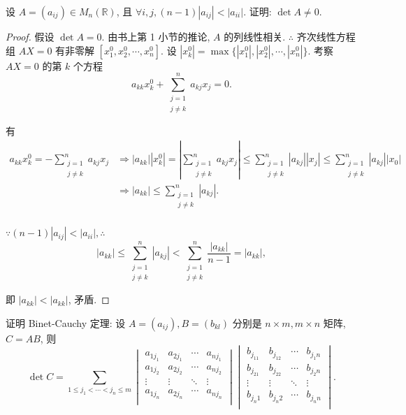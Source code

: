 \documentclass[color=black,device=normal,lang=cn,mode=geye]{elegantnote}
\begin{document}
\begin{exercise}%
    设 $A=(a_{ij})\in M_n(\mathbb{R})$, 且 $\forall i,j,(n-1)|a_{ij}|<|a_{ii}|$. 证明: $\det A\neq0$.
\end{exercise}
\begin{proof}
    假设 $\det A=0$. 由书上第 1 小节的推论, $A$ 的列线性相关. $\therefore$ 齐次线性方程组 $AX=0$ 有非零解 $[x^0_1,x^0_2,\cdots,x^0_n]$. 设 $|x^0_k|=\max\{|x^0_1|,|x^0_2|,\cdots,|x^0_n|\}$. 考察 $AX=0$ 的第 $k$ 个方程
    \[a_{kk}x^0_k+\sum_{\substack{j=1\\j\neq k}}^na_{kj}x_j=0.\]

    有
    \begin{align*}
        a_{kk}x^0_k=-\sum_{\substack{j=1\\j\neq k}}^na_{kj}x_j & \Rightarrow|a_{kk}||x^0_k|=\left|\sum_{\substack{j=1\\j\neq k}}^na_{kj}x_j\right|\leq\sum_{\substack{j=1\\j\neq k}}^n|a_{kj}||x_j|\leq\sum_{\substack{j=1\\j\neq k}}^n|a_{kj}||x_0| \\
        & \Rightarrow|a_{kk}|\leq\sum_{\substack{j=1\\j\neq k}}^n|a_{kj}|. \\
    \end{align*}

    $\because(n-1)|a_{ij}|<|a_{ii}|,\therefore$
    \[|a_{kk}|\leq\sum_{\substack{j=1\\j\neq k}}^n|a_{kj}|<\sum_{\substack{j=1\\j\neq k}}^n\dfrac{|a_{kk}|}{n-1}=|a_{kk}|,\]

    即 $|a_{kk}|<|a_{kk}|$, 矛盾.
\end{proof}
\begin{exercise}\label{ex3.6}
    证明 Binet-Cauchy 定理: 设 $A=(a_{ij}),B=(b_{kl})$ 分别是 $n\times m,m\times n$ 矩阵, $C=AB$, 则
    \begin{equation}\label{eq5.1}
        \det C=\sum\limits_{1\leq j_1<\cdots<j_n\leq m}\begin{vmatrix}
            a_{1j_1} & a_{2j_1} & \cdots & a_{nj_1} \\
            a_{1j_2} & a_{2j_2} & \cdots & a_{nj_2} \\
            \vdots & \vdots & \ddots & \vdots \\
            a_{1j_n} & a_{2j_n} & \cdots & a_{nj_n} \\
        \end{vmatrix}\begin{vmatrix}
            b_{j_11} & b_{j_12} & \cdots & b_{j_1n} \\
            b_{j_21} & b_{j_22} & \cdots & b_{j_2n} \\
            \vdots & \vdots & \ddots & \vdots \\
            b_{j_n1} & b_{j_n2} & \cdots & b_{j_nn} \\
        \end{vmatrix}.
    \end{equation}
\end{exercise}
\end{document}
